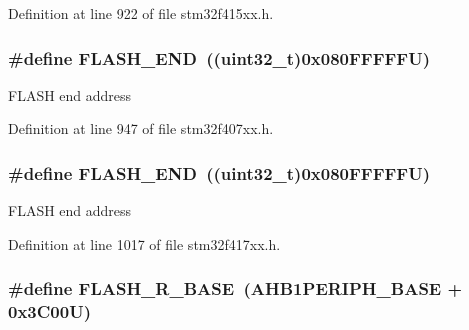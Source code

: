 Definition at line 922 of file stm32f415xx.\+h.

\subsubsection[{\texorpdfstring{F\+L\+A\+S\+H\+\_\+\+E\+ND}{FLASH_END}}]{\setlength{\rightskip}{0pt plus 5cm}\#define F\+L\+A\+S\+H\+\_\+\+E\+ND~((uint32\+\_\+t)0x080\+F\+F\+F\+F\+F\+U)}\hypertarget{group___peripheral__registers__structures_ga8be554f354e5aa65370f6db63d4f3ee4}{}\label{group___peripheral__registers__structures_ga8be554f354e5aa65370f6db63d4f3ee4}
F\+L\+A\+SH end address 

Definition at line 947 of file stm32f407xx.\+h.

\subsubsection[{\texorpdfstring{F\+L\+A\+S\+H\+\_\+\+E\+ND}{FLASH_END}}]{\setlength{\rightskip}{0pt plus 5cm}\#define F\+L\+A\+S\+H\+\_\+\+E\+ND~((uint32\+\_\+t)0x080\+F\+F\+F\+F\+F\+U)}\hypertarget{group___peripheral__registers__structures_ga8be554f354e5aa65370f6db63d4f3ee4}{}\label{group___peripheral__registers__structures_ga8be554f354e5aa65370f6db63d4f3ee4}
F\+L\+A\+SH end address 

Definition at line 1017 of file stm32f417xx.\+h.

\subsubsection[{\texorpdfstring{F\+L\+A\+S\+H\+\_\+\+R\+\_\+\+B\+A\+SE}{FLASH_R_BASE}}]{\setlength{\rightskip}{0pt plus 5cm}\#define F\+L\+A\+S\+H\+\_\+\+R\+\_\+\+B\+A\+SE~({\bf A\+H\+B1\+P\+E\+R\+I\+P\+H\+\_\+\+B\+A\+SE} + 0x3\+C00\+U)}\hypertarget{group___peripheral__registers__structures_ga8e21f4845015730c5731763169ec0e9b}{}\label{group___peripheral__registers__structures_ga8e21f4845015730c5731763169ec0e9b}


